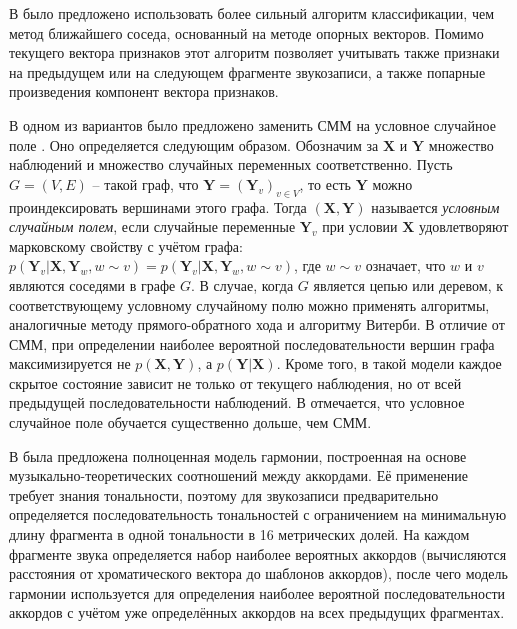 В \cite{Weller2009} было предложено использовать более сильный алгоритм
классификации, чем метод ближайшего соседа, основанный на методе опорных
векторов. Помимо текущего вектора признаков этот алгоритм позволяет учитывать
также признаки на предыдущем или на следующем фрагменте звукозаписи, а также
попарные произведения компонент вектора признаков.

В одном из вариантов \cite{Burgoyne2007} было предложено заменить СММ на
условное случайное поле \cite{Lafferty2001}. Оно определяется следующим образом.
Обозначим за $\boldsymbol{X}$ и $\boldsymbol{Y}$ множество наблюдений и
множество случайных переменных соответственно. Пусть $G = (V, E)$ -- такой граф,
что $\boldsymbol{Y} = (\boldsymbol{Y}_v)_{v \in V}$, то есть $\boldsymbol{Y}$
можно проиндексировать вершинами этого графа. Тогда $(\boldsymbol{X},
\boldsymbol{Y})$ называется \emph{условным случайным полем}, если случайные
переменные $\boldsymbol{Y}_v$ при условии $\boldsymbol{X}$ удовлетворяют
марковскому свойству с учётом графа: $p(\boldsymbol{Y}_v | \boldsymbol{X},
\boldsymbol{Y}_w, w \sim v) = p(\boldsymbol{Y}_v | \boldsymbol{X},
\boldsymbol{Y}_w, w \sim v)$, где $w \sim v$ означает, что $w$ и $v$ являются
соседями в графе $G$. В случае, когда $G$ является цепью или деревом, к
соответствующему условному случайному полю можно применять алгоритмы,
аналогичные методу прямого-обратного хода и алгоритму Витерби. В отличие от СММ,
при определении наиболее вероятной последовательности вершин графа
максимизируется не $p(\boldsymbol{X}, \boldsymbol{Y})$, а $p(\boldsymbol{Y} |
\boldsymbol{X})$. Кроме того, в такой модели каждое скрытое состояние зависит не
только от текущего наблюдения, но от всей предыдущей последовательности
наблюдений. В \cite{Burgoyne2007} отмечается, что условное случайное поле
обучается существенно дольше, чем СММ.

В \cite{DeHaas2012} была предложена полноценная модель гармонии, построенная на
основе музыкально-теоретических соотношений между аккордами. Её применение
требует знания тональности, поэтому для звукозаписи предварительно определяется
последовательность тональностей с ограничением на минимальную длину фрагмента в
одной тональности в 16 метрических долей. На каждом фрагменте звука определяется
набор наиболее вероятных аккордов (вычисляются расстояния от хроматического
вектора до шаблонов аккордов), после чего модель гармонии используется для
определения наиболее вероятной последовательности аккордов с учётом уже
определённых аккордов на всех предыдущих фрагментах.

